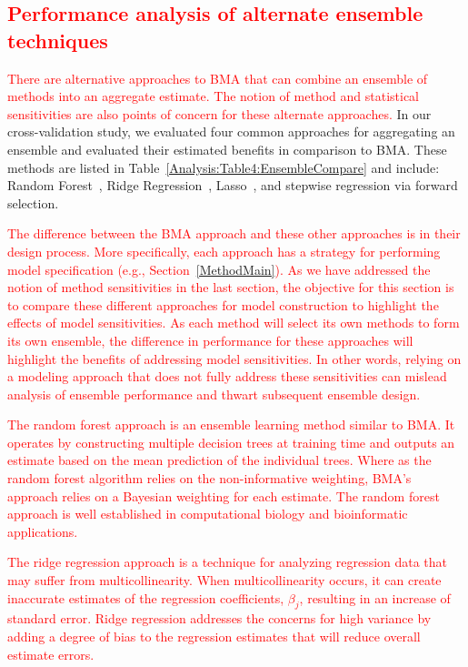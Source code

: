 \documentclass[journal=jpcbfk, manuscript=article]{achemso}
\newcommand{\+}[1]{\ensuremath{\mathbf{#1}}}
\newcommand{\rev}[1]{\textsf{\textcolor{red}{#1}}}
\begin{document}
\subsection{\rev{Performance analysis of alternate ensemble techniques}}
\label{Results:BMA_Variants}
\rev{There are alternative approaches to BMA that can combine an ensemble of methods into an aggregate estimate.
The notion of method and statistical sensitivities are also points of concern for these alternate approaches.}
In our cross-validation study, we evaluated four common approaches for aggregating an ensemble and evaluated their estimated benefits in comparison to BMA.
These methods are listed in Table~\ref{Analysis:Table4:EnsembleCompare} and include: Random Forest~\cite{Breiman:2001}, Ridge Regression~\cite{Hoerl:2000}, Lasso~\cite{Tibshirani:1994}, and stepwise regression via forward selection.

\rev{The difference between the BMA approach and these other approaches is in their design process.
More specifically, each approach has a strategy for performing model specification (e.g., Section~\ref{MethodMain}).
As we have addressed the notion of method sensitivities in the last section, the objective for this section is to compare these different approaches for model construction to highlight the effects of model sensitivities.
As each method will select its own methods to form its own ensemble, the difference in performance for these approaches will highlight the benefits of addressing model sensitivities.
In other words, relying on a modeling approach that does not fully address these sensitivities can mislead analysis of ensemble performance and thwart subsequent ensemble design.}

\rev{The random forest approach is an ensemble learning method similar to BMA.
	It operates by constructing multiple decision trees at training time and outputs an estimate based on the mean prediction of the individual trees. 
Where as the random forest algorithm relies on the non-informative weighting, BMA's approach relies on a Bayesian weighting for each estimate.
The random forest approach is well established in computational biology and bioinformatic applications.}

\rev{The ridge regression approach is a technique for analyzing regression data that may suffer from multicollinearity. 
When multicollinearity occurs, it can create inaccurate estimates of the regression coefficients, $\beta_j$, resulting in an increase of standard error.
Ridge regression addresses the concerns for high variance by adding a degree of bias to the regression estimates that will reduce overall estimate errors.} 
\end{document}
